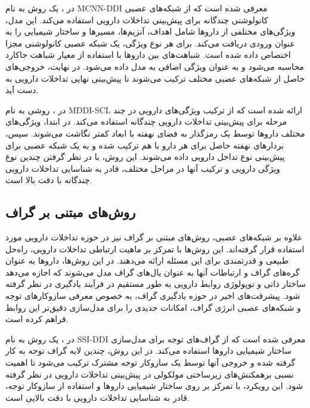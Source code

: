 در \cite{ref_asfand2024}، یک روش به نام MCNN-DDI معرفی شده است که از شبکه‌های عصبی کانولوشنی چندگانه برای پیش‌بینی تداخلات دارویی استفاده می‌کند. این مدل، ویژگی‌های مختلفی از داروها شامل اهداف، آنزیم‌ها، مسیرها و ساختار شیمیایی را به عنوان ورودی دریافت می‌کند. برای هر نوع ویژگی، یک شبکه عصبی کانولوشنی مجزا اختصاص داده شده است. شباهت‌های بین داروها با استفاده از معیار شباهت جاکارد محاسبه می‌شود و به عنوان ویژگی اضافی به مدل داده می‌شود. در نهایت، خروجی‌های حاصل از شبکه‌های عصبی مختلف ترکیب می‌شوند تا پیش‌بینی نهایی تداخلات دارویی به دست آید.

در \cite{ref_lin2022}، روشی به نام MDDI-SCL ارائه شده است که از ترکیب ویژگی‌های دارویی در چند مرحله برای پیش‌بینی تداخلات دارویی چندگانه استفاده می‌کند. در ابتدا، ویژگی‌های مختلف داروها توسط یک رمزگذار به فضای نهفته با ابعاد کمتر نگاشت می‌شوند. سپس، بردارهای نهفته حاصل برای هر دارو با هم ترکیب شده و به یک شبکه عصبی برای پیش‌بینی نوع تداخل دارویی داده می‌شوند. این روش، با در نظر گرفتن چندین نوع ویژگی دارویی و ترکیب آنها در مراحل مختلف، قادر به شناسایی تداخلات دارویی چندگانه با دقت بالا است.

\subsection{روش‌های مبتنی بر گراف}

علاوه بر شبکه‌های عصبی، روش‌های مبتنی بر گراف نیز در حوزه تداخلات دارویی مورد استفاده قرار گرفته‌اند. این روش‌ها با تمرکز بر ماهیت ارتباطی تداخلات دارویی، راه‌حل طبیعی و قدرتمندی برای این مسئله ارائه می‌دهند. در این روش‌ها، داروها به عنوان گره‌های گراف و ارتباطات آنها به عنوان یال‌های گراف مدل می‌شوند که اجازه می‌دهد ساختار ذاتی و توپولوژی روابط دارویی به طور مستقیم در فرآیند یادگیری در نظر گرفته شود. پیشرفت‌های اخیر در حوزه یادگیری گراف، به خصوص معرفی سازوکار‌های توجه و شبکه‌های عصبی انرژی گراف، امکانات جدیدی را برای مدل‌سازی دقیق‌تر این روابط فراهم کرده است.

در \cite{ref_nyamabo2021}، یک روش به نام SSI-DDI معرفی شده است که از گراف‌های توجه برای مدل‌سازی ساختار شیمیایی داروها استفاده می‌کند. در این روش، چندین لایه گراف توجه به کار گرفته شده و خروجی آنها توسط یک سازوکار توجه مشترک ترکیب می‌شود تا اهمیت نسبی برهمکنش‌های زیرساختی مولکولی در پیش‌بینی تداخلات دارویی در نظر گرفته شود. این رویکرد، با تمرکز بر روی ساختار شیمیایی داروها و استفاده از سازوکار توجه، قادر به شناسایی تداخلات دارویی با دقت بالایی است.



